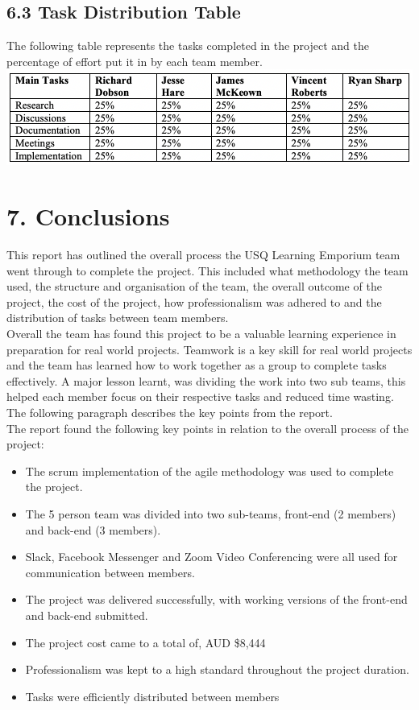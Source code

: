 \documentclass[11pt]{article}
\begin{document}
\subsection{6.3 Task Distribution Table}
The following table represents the tasks completed in the project and the percentage of effort put it in by each team member. \\

\includegraphics[scale=0.71]{task_distro.png} \\

\newpage



\section{7. Conclusions}
This report has outlined the overall process the USQ Learning Emporium team went through to complete the project. This included what methodology the team used, the structure and organisation of the team, the overall outcome of the project, the cost of the project, how professionalism was adhered to and the distribution of tasks between team members. \\

Overall the team has found this project to be a valuable learning experience in preparation for real world projects. Teamwork is a key skill for real world projects and the team has learned how to work together as a group to complete tasks effectively. A major lesson learnt, was dividing the work into two sub teams, this helped each member focus on their respective tasks and reduced time wasting. The following paragraph describes the key points from the report. \\

The report found the following key points in relation to the overall process of the project: 

\begin{itemize}
\item The scrum implementation of the agile methodology was used to complete the project.
\item The 5 person team was divided into two sub-teams, front-end (2 members) and back-end (3 members).
\item Slack, Facebook Messenger and Zoom Video Conferencing were all used for communication between members.
\item The project was delivered successfully, with working versions of the front-end and back-end submitted.
\item The project cost came to a total of, AUD \$8,444
\item Professionalism was kept to a high standard throughout the project duration.
\item Tasks were efficiently distributed between members
\end{itemize}
\end{document}
